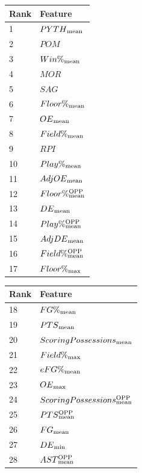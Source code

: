 \documentclass[]{article}
\def\SPSB#1#2{\rlap{\textsuperscript{#1}}\SB{#2}}
\def\SB#1{\textsubscript{{#1}}}
\begin{document}
\begin{table}[ht]
\centering
\begin{tabular}{@{}ll@{}}
\toprule
Rank & Feature							   \\ \midrule
1  & $PYTH\SB{mean}$          \\ 
2  & $POM$                 \\
3  & $Win\%\SB{mean}$                       \\
4  & $MOR$                 \\
5  & $SAG$                 \\
6  & $Floor\%\SB{mean}$                 \\
7  & $OE\SB{mean}$      \\
8  & $Field\%\SB{mean}$                 \\
9  & $RPI$                 \\
10 & $Play\%\SB{mean}$                  \\
11 & $AdjOE\SB{mean}$ \\
12 & $Floor\%\SPSB{OPP}{mean}$              \\
13 & $DE\SB{mean}$      \\
14 & $Play\%\SPSB{OPP}{mean}$               \\
15 & $AdjDE\SB{mean}$ \\
16 & $Field\%\SPSB{OPP}{mean}$              \\
17 & $Floor\%\SB{max}$                  \\
\bottomrule
\end{tabular}
\hspace{1em}
\begin{tabular}{@{}ll@{}}
\toprule
Rank & Feature							   \\ \midrule
18 & $FG\%\SB{mean}$                    \\
19 & $PTS\SB{mean}$                        \\
20 & $Scoring Possessions\SB{mean}$       \\
21 & $Field\%\SB{max}$                  \\
22 & $eFG\%\SB{mean}$         \\
23 & $OE\SB{max}$       \\
24 & $Scoring Possessions\SPSB{OPP}{mean}$    \\
25 & $PTS\SPSB{OPP}{mean}$                     \\
26 & $FG\SB{mean}$                         \\
27 & $DE\SB{min}$       \\
28 & $AST\SPSB{OPP}{mean}$                     \\

\end{tabular}
\end{table}
\end{document}

